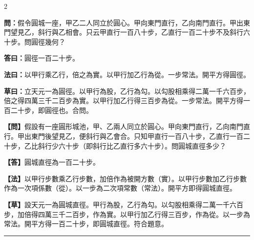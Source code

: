 \documentclass[11pt,a4paper]{article}
\newcommand{\longline}{\noindent\rule{\textwidth}{0.4pt}}
\newcommand{\wenC}[1]{\par\noindent\textbf{\textcolor{probcolor}{問：}}{#1}\par}
\newcommand{\daC}[1]{\par\noindent\textbf{\textcolor{anscolor}{答曰：}}{#1}\par}
\newcommand{\fayueC}[1]{\par\noindent\textbf{\textcolor{methodcolor}{法曰：}}{#1}\par}
\newcommand{\caoyueC}[1]{\par\noindent\textbf{草曰：}{#1}\par}
\newcommand{\wenM}[1]{\par\noindent\textbf{\textcolor{probcolor}{【問】}}{#1}\par}
\newcommand{\daM}[1]{\par\noindent\textbf{\textcolor{anscolor}{【答】}}{#1}\par}
\newcommand{\fayueM}[1]{\par\noindent\textbf{\textcolor{methodcolor}{【法】}}{#1}\par}
\newcommand{\caoyueM}[1]{\par\noindent\textbf{【草】}{#1}\par}
\begin{document}
\begin{paracol}{2}

\wenC{假令圓城一座，甲乙二人同立於圓心。甲向東門直行，乙向南門直行。甲出東門望見乙，斜行與乙相會。只云甲直行一百八十步，乙直行一百二十步不及斜行六十步。問圓徑幾何？}

\daC{圓徑一百二十步。}

\fayueC{以甲行乘乙行，倍之為實。以甲行加乙行為從。一步常法。開平方得圓徑。}

\caoyueC{立天元一為圓徑。以甲行為股，乙行為勾。以勾股相乘得二萬一千六百步，倍之得四萬三千二百步為實。以甲行加乙行得三百步為從。一步常法。開平方得一百二十步，即圓徑也。合問。}

\switchcolumn

\wenM{假設有一座圓形城池，甲、乙兩人同立於圓心。甲向東門直行，乙向南門直行。甲出東門後望見乙，便斜行與乙會合。只知甲直行一百八十步，乙直行一百二十步，乙比斜行少六十步（即斜行比乙直行多六十步）。問圓城直徑多少？}

\daM{圓城直徑為一百二十步。}

\fayueM{以甲行步數乘乙行步數，加倍作為被開方數（實）。以甲行步數加乙行步數作為一次項係數（從）。以一步為二次項常數（常法）。開平方即得圓城直徑。}

\caoyueM{設天元一為圓城直徑。甲行為股，乙行為勾。以勾股相乘得二萬一千六百步，加倍得四萬三千二百步，作為實。以甲行加乙行得三百步，作為從。以一步為常法。開平方得一百二十步，即圓城直徑。符合題意。}

\end{paracol}

\vspace{0.3cm}
\longline
\end{document}

